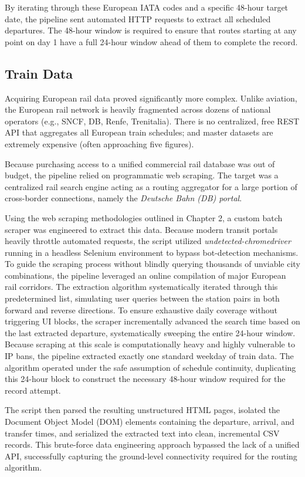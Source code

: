 By iterating through these European IATA codes and a specific 48-hour target date, the pipeline sent automated HTTP requests to extract all scheduled departures. The 48-hour window is required to ensure that routes starting at any point on day 1 have a full 24-hour window ahead of them to complete the record.

\subsection{Train Data}
\label{subsec:train_data}
Acquiring European rail data proved significantly more complex. Unlike aviation, the European rail network is heavily fragmented across dozens of national operators (e.g., SNCF, DB, Renfe, Trenitalia). There is no centralized, free REST API that aggregates all European train schedules; and master datasets are extremely expensive (often approaching five figures).

Because purchasing access to a unified commercial rail database was out of budget, the pipeline relied on programmatic web scraping. The target was a centralized rail search engine acting as a routing aggregator for a large portion of cross-border connections, namely the \textit{Deutsche Bahn (DB) portal}.

Using the web scraping methodologies outlined in Chapter 2, a custom batch scraper was engineered to extract this data. Because modern transit portals heavily throttle automated requests, the script utilized \textit{undetected-chromedriver} running in a headless Selenium environment to bypass bot-detection mechanisms. To guide the scraping process without blindly querying thousands of unviable city combinations, the pipeline leveraged an online compilation of major European rail corridors. The extraction algorithm systematically iterated through this predetermined list, simulating user queries between the station pairs in both forward and reverse directions. To ensure exhaustive daily coverage without triggering UI blocks, the scraper incrementally advanced the search time based on the last extracted departure, systematically sweeping the entire 24-hour window. Because scraping at this scale is computationally heavy and highly vulnerable to IP bans, the pipeline extracted exactly one standard weekday of train data. The algorithm operated under the safe assumption of schedule continuity, duplicating this 24-hour block to construct the necessary 48-hour window required for the record attempt.

The script then parsed the resulting unstructured HTML pages, isolated the Document Object Model (DOM) elements containing the departure, arrival, and transfer times, and serialized the extracted text into clean, incremental CSV records. This brute-force data engineering approach bypassed the lack of a unified API, successfully capturing the ground-level connectivity required for the routing algorithm.

